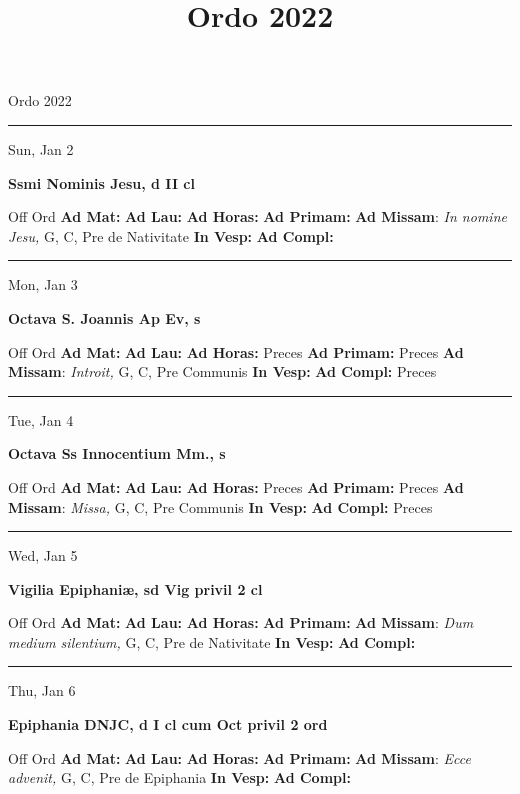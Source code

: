 \documentclass[letterpaper, 10pt]{article}
\title{Ordo 2022}
\begin{document}
\begin{center}
\Huge Ordo 2022\end{center}

\hrule
\begin{center}
Sun, Jan 2
\end{center}\textbf{ \large Ssmi Nominis Jesu, \textnormal{\normalsize d II cl}}
\begin{justify}
Off Ord
\textbf{Ad Mat: }
\textbf{Ad Lau: }
\textbf{Ad Horas: }
\textbf{Ad Primam: }
\textbf{Ad Missam}: \textit{In nomine Jesu,} G, C, Pre de Nativitate
\textbf{In Vesp: }
\textbf{Ad Compl: }\end{justify}



\hrule
\begin{center}
Mon, Jan 3
\end{center}\textbf{ \large Octava S. Joannis Ap Ev, \textnormal{\normalsize s}}
\begin{justify}
Off Ord
\textbf{Ad Mat: }
\textbf{Ad Lau: }
\textbf{Ad Horas: }Preces
\textbf{Ad Primam: }Preces
\textbf{Ad Missam}: \textit{Introit,} G, C, Pre Communis
\textbf{In Vesp: }
\textbf{Ad Compl: }Preces\end{justify}



\hrule
\begin{center}
Tue, Jan 4
\end{center}\textbf{ \large Octava Ss Innocentium Mm., \textnormal{\normalsize s}}
\begin{justify}
Off Ord
\textbf{Ad Mat: }
\textbf{Ad Lau: }
\textbf{Ad Horas: }Preces
\textbf{Ad Primam: }Preces
\textbf{Ad Missam}: \textit{Missa,} G, C, Pre Communis
\textbf{In Vesp: }
\textbf{Ad Compl: }Preces\end{justify}



\hrule
\begin{center}
Wed, Jan 5
\end{center}\textbf{ \large Vigilia Epiphaniæ, \textnormal{\normalsize sd Vig privil 2 cl}}
\begin{justify}
Off Ord
\textbf{Ad Mat: }
\textbf{Ad Lau: }
\textbf{Ad Horas: }
\textbf{Ad Primam: }
\textbf{Ad Missam}: \textit{Dum medium silentium,} G, C, Pre de Nativitate
\textbf{In Vesp: }
\textbf{Ad Compl: }\end{justify}



\hrule
\begin{center}
Thu, Jan 6
\end{center}\textbf{ \large Epiphania DNJC, \textnormal{\normalsize d I cl cum Oct privil 2 ord}}
\begin{justify}
Off Ord
\textbf{Ad Mat: }
\textbf{Ad Lau: }
\textbf{Ad Horas: }
\textbf{Ad Primam: }
\textbf{Ad Missam}: \textit{Ecce advenit,} G, C, Pre de Epiphania
\textbf{In Vesp: }
\textbf{Ad Compl: }\end{justify}
\end{document}
